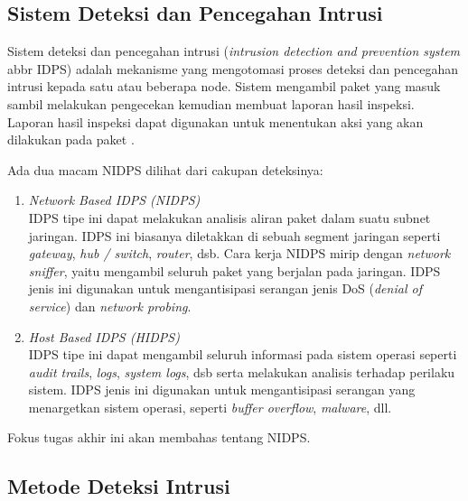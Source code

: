   \subsection{Sistem Deteksi dan Pencegahan Intrusi}

    Sistem deteksi dan pencegahan intrusi (\emph{intrusion detection and prevention system} abbr IDPS) adalah mekanisme yang mengotomasi proses deteksi dan pencegahan intrusi kepada satu atau beberapa node. Sistem mengambil paket yang masuk sambil melakukan pengecekan kemudian membuat laporan hasil inspeksi. Laporan hasil inspeksi dapat digunakan untuk menentukan aksi yang akan dilakukan pada paket \citep{nist2007}.

    Ada dua macam NIDPS dilihat dari cakupan deteksinya:
    \begin{enumerate}

      \item 
      \emph{Network Based IDPS (NIDPS)} \\
      IDPS tipe ini dapat melakukan analisis aliran paket dalam suatu subnet jaringan. IDPS ini biasanya diletakkan di sebuah segment jaringan seperti \emph{gateway}, \emph{hub / switch}, \emph{router}, dsb. Cara kerja NIDPS mirip dengan \emph{network sniffer}, yaitu mengambil seluruh paket yang berjalan pada jaringan. IDPS jenis ini digunakan untuk mengantisipasi serangan jenis DoS (\emph{denial of service}) dan \emph{network probing}.

       \item 
      \emph{Host Based IDPS (HIDPS)} \\
      IDPS tipe ini dapat mengambil seluruh informasi pada sistem operasi seperti \emph{audit trails}, \emph{logs}, \emph{system logs}, dsb serta melakukan analisis terhadap perilaku sistem. IDPS jenis ini digunakan untuk mengantisipasi serangan yang menargetkan sistem operasi, seperti \emph{buffer overflow}, \emph{malware}, dll.

    \end{enumerate}

    Fokus tugas akhir ini akan membahas tentang NIDPS.

  \subsection{Metode Deteksi Intrusi}

